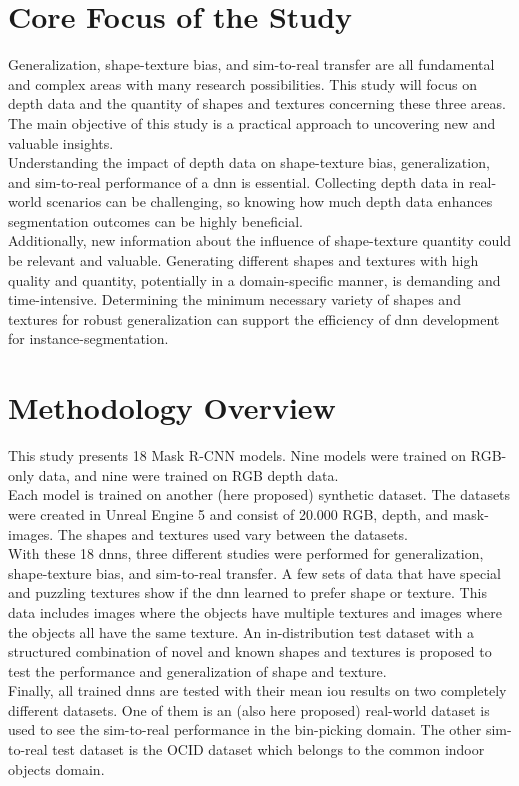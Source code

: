 	\section{Core Focus of the Study}    %
	\label{sec:core-focus-of-the-study}
		Generalization, shape-texture bias, and sim-to-real transfer are all fundamental and complex areas with many research possibilities. This study will focus on depth data and the quantity of shapes and textures concerning these three areas. The main objective of this study is a practical approach to uncovering new and valuable insights.\\
		Understanding the impact of depth data on shape-texture bias, generalization, and sim-to-real performance of a \ac{dnn} is essential. Collecting depth data in real-world scenarios can be challenging, so knowing how much depth data enhances segmentation outcomes can be highly beneficial.\\
		Additionally, new information about the influence of shape-texture quantity could be relevant and valuable. Generating different shapes and textures with high quality and quantity, potentially in a domain-specific manner, is demanding and time-intensive. Determining the minimum necessary variety of shapes and textures for robust generalization can support the efficiency of \ac{dnn} development for instance-segmentation.
		
	
	\clearpage
	\section{Methodology Overview}
	\label{sec:methodology-overview}
		This study presents 18 Mask R-CNN \cite{Kaiming2017} models. Nine models were trained on RGB-only data, and nine were trained on RGB depth data.\\
		Each model is trained on another (here proposed) synthetic dataset. The datasets were created in Unreal Engine 5 \cite{Romero2022} and consist of 20.000 RGB, depth, and mask-images. The shapes and textures used vary between the datasets.\\ 
		With these 18 \ac{dnn}s, three different studies were performed for generalization, shape-texture bias, and sim-to-real transfer. A few sets of data that have special and puzzling textures show if the \ac{dnn} learned to prefer shape or texture. This data includes images where the objects have multiple textures and images where the objects all have the same texture. An in-distribution test dataset with a structured combination of novel and known shapes and textures is proposed to test the performance and generalization of shape and texture.\\
		Finally, all trained \ac{dnn}s are tested with their mean \ac{iou} results on two completely different datasets. One of them is an (also here proposed) real-world dataset is used to see the sim-to-real performance in the bin-picking domain. The other sim-to-real test dataset is the OCID dataset \cite{Suchi2019} which belongs to the common indoor objects domain. 
		
